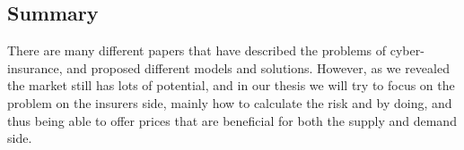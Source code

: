 \subsection{Summary}
There are many different papers that have described the problems of cyber-insurance, and proposed different models and solutions. However, as we revealed the market still has lots of potential, and in our thesis we will try to focus on the problem on the insurers side, mainly how to calculate the risk and by doing, and thus being able to offer prices that are beneficial for both the supply and demand side.




